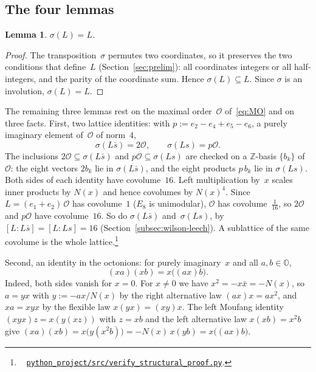 \documentclass[twoside,english]{paper}
\numberwithin{equation}{section}
\numberwithin{figure}{section}
\newtheorem{lemma}[theorem]{Lemma}
\theoremstyle{definition}
\theoremstyle{remark}
\newcommand{\OO}{\mathbb{O}}          %
\newcommand{\MO}{\mathcal{O}}         %
\newcommand{\ZZ}{\mathbb{Z}}
\newcommand{\Nrm}{N}                  %
\newcommand{\scriptref}[1]{\cite{repo}~%
  \href{https://github.com/koeplinger/leech\_alg/blob/main/python\_project/src/#1}%
  {\nolinkurl{python_project/src/#1}}}
\begin{document}
\subsection{The four lemmas}

\begin{lemma}\label{lem:sigma-L}
$\sigma(L) = L$.
\end{lemma}

\begin{proof}
The transposition~$\sigma$ permutes two coordinates, so it preserves
the two conditions that define~$L$ (Section~\ref{sec:prelim}):
all coordinates integers or all half-integers, and the parity of the
coordinate sum.  Hence
$\sigma(L) \subseteq L$.  Since $\sigma$ is an involution,
$\sigma(L) = L$.
\end{proof}

The remaining three lemmas rest on the maximal order~$\MO$
of~\eqref{eq:MO} and on three facts.  First, two lattice identities:
with $p := e_2 - e_4 + e_5 - e_6$, a purely imaginary element of~$\MO$
of norm~$4$,
\begin{equation}\label{eq:multiples}
  \sigma(L\bar s) = 2\MO, \qquad \sigma(Ls) = p\MO .
\end{equation}
The inclusions $2\MO \subseteq \sigma(L\bar s)$ and
$p\MO \subseteq \sigma(Ls)$ are checked on a $\ZZ$-basis $\{b_k\}$
of~$\MO$: the eight vectors $2b_k$ lie in $\sigma(L\bar s)$, and the
eight products $p\,b_k$ lie in $\sigma(Ls)$.  Both sides of each
identity have covolume~$16$.  Left multiplication by~$x$ scales inner
products by $\Nrm(x)$ and hence covolumes by $\Nrm(x)^4$.  Since
$L = (e_1 + e_2)\,\MO$ has covolume~$1$ ($E_8$ is unimodular), $\MO$
has covolume~$\tfrac1{16}$, so $2\MO$ and $p\MO$ have covolume~$16$.
So do $\sigma(L\bar s)$ and~$\sigma(Ls)$, by
$[L : L\bar s] = [L : Ls] = 16$ (Section~\ref{subsec:wilson-leech}).
A sublattice of the same covolume is the whole
lattice.\footnote{\scriptref{verify\_structural\_proof.py}.}

Second, an identity in the octonions: for purely imaginary~$x$ and all
$a, b \in \OO$,
\begin{equation}\label{eq:moufang-imaginary}
  (xa)(xb) = x\bigl((ax)b\bigr).
\end{equation}
Indeed, both sides vanish for $x = 0$.  For $x \ne 0$ we have
$x^2 = -x\bar x = -\Nrm(x)$, so $a = yx$ with $y := -ax/\Nrm(x)$ by the
right alternative law $(ax)x = ax^2$, and $xa = xyx$ by the flexible
law $x(yx) = (xy)x$.  The left Moufang identity $(xyx)z = x(y(xz))$
\cite{ConwaySmith2003} with $z = xb$ and the left alternative law
$x(xb) = x^2 b$ give
$(xa)(xb) = x\bigl(y(x^2 b)\bigr) = -\Nrm(x)\,x(yb) = x\bigl((ax)b\bigr)$.
\end{document}
